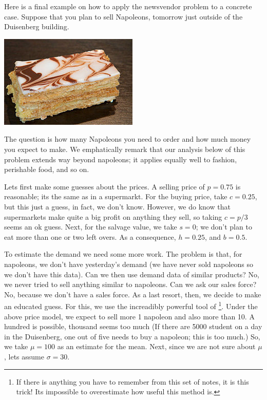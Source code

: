 



\begin{example}
Here is a final example on how to apply the newsvendor problem to a concrete case.  Suppose that you plan to sell Napoleons, tomorrow  just outside of the Duisenberg building.
  \begin{center}
   \includegraphics[scale = 1.0]{figures/mille-feuille}
  \end{center}
The question is how  many  Napoleons  you need to order and how much money  you expect to make. We emphatically remark that our analysis below  of this problem extends way beyond napoleons; it applies equally well to fashion, perishable food, and so on.
  

Lets first make some guesses about the prices. A selling price of $p=0.75$ is reasonable; its the same as in a supermarkt. For the buying price, take $c = 0.25$, but this just a guess, in fact, we don't know. However, we do know that supermarkets make quite a big profit on anything they sell, so taking $c=p/3$ seems an ok guess. Next, for the salvage value, we take $s=0$; we don't plan to eat more than one or two left overs. As a consequence, $h = 0.25$, and $b = 0.5$. 

To estimate  the demand we need some more work. The problem is that, for napoleons, we don't have yesterday's demand (we have never sold napoleons so we don't have this data). Can we then use demand data of similar products?  No, we  never tried to sell anything similar to napoleons. Can we ask our sales force?  No, because  we don't have a sales force.  As a last resort, then, we decide to make an educated guess. For this, we use the increadibly powerful tool of \footnote{If there is anything you have to remember from this set of notes, it is this trick! Its impossible to overestimate how useful this method is.}. Under the above price model, we expect to sell more 1 napoleon and also more than 10. A hundred  is possible, thousand seems too much (If there are 5000 student on a day in the Duisenberg, one out of five needs to buy a napoleon; this is too much.) So, we take  $\mu=100$ as an estimate for the mean. Next, since we are not sure about $\mu$, lets assume $\sigma=30$. 


\end{example}

